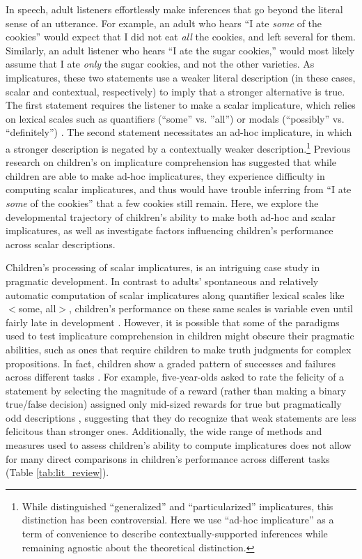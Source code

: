 \documentclass[man]{apa2}
\begin{document}
In speech, adult listeners effortlessly make inferences that go beyond the literal sense of an utterance. For example, an adult who hears ``I ate \emph{some} of the cookies'' would expect that I did not eat \emph{all} the cookies, and left several for them. Similarly, an adult listener who hears ``I ate the sugar cookies,'' would most likely assume that I ate \emph{only} the sugar cookies, and not the other varieties. As implicatures, these two statements use a weaker literal description (in these cases, scalar and contextual, respectively) to imply that a stronger alternative is true. The first statement requires the listener to make a scalar implicature, which relies on lexical scales such as quantifiers (``some'' vs. ''all'') or modals (``possibly'' vs. ``definitely'') \cite{horn1972}. The second statement necessitates an ad-hoc implicature, in which a stronger description is negated by a contextually weaker description.\footnote{While  distinguished ``generalized'' and ``particularized'' implicatures, this distinction has been controversial. Here we use ``ad-hoc implicature'' as a term of convenience to describe contextually-supported inferences while remaining agnostic about the theoretical distinction.} Previous research on children's on implicature comprehension has suggested that while children are able to make ad-hoc implicatures, they experience difficulty in computing scalar implicatures, and thus would have trouble inferring from ``I ate \emph{some} of the cookies'' that a few cookies still remain. Here, we explore the developmental trajectory of children's ability to make both ad-hoc and scalar implicatures, as well as investigate factors influencing children's performance across scalar descriptions. 

Children's processing of scalar implicatures, is an intriguing case study in pragmatic development. In contrast to adults' spontaneous and relatively automatic computation of scalar implicatures along quantifier lexical scales like  $<${\sc some, all}$>$, children's performance on these same scales is variable even until fairly late in development \cite{noveck2001}. However, it is possible that some of the paradigms used to test implicature comprehension in children might obscure their pragmatic abilities, such as ones that require children to make truth judgments for complex propositions. In fact, children show a graded pattern of successes and failures across different tasks \cite{guasti2005,papafragou2003, papafragou2004}. For example, five-year-olds asked to rate the felicity of a statement by selecting the magnitude of a reward (rather than making a binary true/false decision) assigned only mid-sized rewards for true but pragmatically odd descriptions \cite{katsos2011}, suggesting that they do recognize that weak statements are less felicitous than stronger ones.  Additionally, the wide range of methods and measures used to assess children's ability to compute implicatures does not allow for many direct comparisons in children's performance across different tasks (Table \ref{tab:lit_review}).
\end{document}
